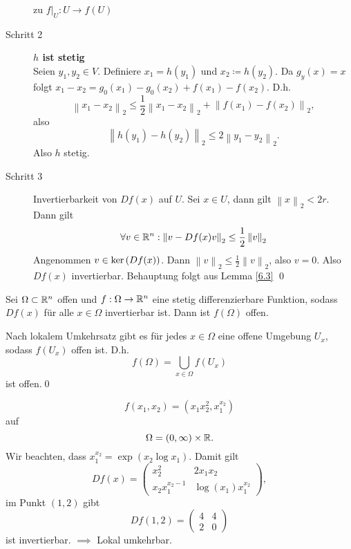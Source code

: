 \begin{proof*}
\begin{description}
\[			\]
			zu $ f|_U : U \to f(U) $
		\item[Schritt 2]
			\textbf{$ h $ ist stetig}\\
			Seien $ y_1, y_2 \in V $.
			Definiere $ x_1 = h(y_1) $ und $ x_2 \coloneqq h(y_2) $.
			Da $ g_y(x) = x $ folgt $ x_1 - x_2 = g_0(x_1) - g_0(x_2) + f(x_1) - f(x_2) $.
			D.h.
			\[
				\left\| x_1 - x_2 \right\| _2 \leq \frac{ 1 }{ 2 } \left\| x_1 - x_2 \right\| _2 + \left\| f(x_1) - f(x_2) \right\| _2,
			\]
			also
			\[
				\left\| h(y_1) - h(y_2) \right\| _2 \leq 2 \left\| y_1 - y_2 \right\| _2.
			\]
			Also $ h $ stetig.
		\item[Schritt 3]
				Invertierbarkeit von $ Df(x) $ auf $ U $.
				Sei $ x \in U $, dann gilt $ \left\| x \right\| _2 < 2r $.
				Dann gilt
				\[
					\forall v \in \mathbb{R} ^n : \left\| v - Df(x) v \right\| _2 \leq  \frac{ 1 }{ 2 } \left\| v \right\| _2
				\]
				Angenommen $ v \in \operatorname{ker} \left( Df(x) \right)  $.
				Dann $ \left\| v \right\| _2 \leq \frac{ 1 }{ 2 } \left\| v \right\| _2 $, also $ v = 0 $.
				Also $ Df(x) $ invertierbar.
				Behauptung folgt aus Lemma \ref{6.3} \qed
	\end{description}
\end{proof*}

\begin{corollary}
	Sei $ \Omega \subset \mathbb{R} ^n $ offen und $ f: \Omega \to \mathbb{R} ^n $ eine stetig differenzierbare Funktion, sodass $ Df(x) $ für alle $ x \in \Omega $ invertierbar ist.
	Dann ist $ f(\Omega) $ offen.
\end{corollary}
\begin{proof*}
	Nach lokalem Umkehrsatz gibt es für jedes $ x \in \Omega $ eine offene Umgebung $ U_x $, sodass $ f\left( U_x \right)  $ offen ist.
	D.h.  
	\[
		f(\Omega) = \bigcup_{x \in \Omega} f\left( U_x \right) 
	\]
	ist offen.\qed
\end{proof*}

\begin{example}
	\[
		f(x_1, x_2) = \left(x_1x_2^2, x_1^{x_2} \right)
	\]
	auf
	\[
		\Omega = \left( 0, \infty \right) \times \mathbb{R} .
	\]
	Wir beachten, dass $ x_1^{x_2} = \exp \left( x_2 \log x_1 \right)  $.
	Damit gilt
	\[
		Df(x) =
		\begin{pmatrix} 
			x_2^2 & 2x_1x_2 \\
			x_2x_1^{x_2 - 1} & \log \left( x_1 \right) x_1^{x_2}
		\end{pmatrix} ,
	\]
	im Punkt $ (1, 2) $ gibt
	\[
		Df(1, 2) = \begin{pmatrix} 4 & 4 \\ 2 & 0 \end{pmatrix} 
	\]
	ist invertierbar.
	$ \implies  $ Lokal umkehrbar.
\end{example}


